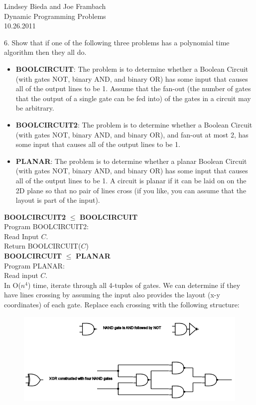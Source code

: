 \documentclass[10pt]{article}
\newcommand{\tab}{\hspace*{2em}}
\begin{document}
	\begin{flushright}
	Lindsey Bieda and Joe Frambach\\
	Dynamic Programming Problems\\
	10.26.2011
	\end{flushright}
	6.  Show that if one of the following three problems has a polynomial time algorithm then they all do.
	\begin{itemize}
		\item \textbf{BOOLCIRCUIT}: The problem is to determine whether a Boolean Circuit (with gates NOT, binary AND, and
					binary OR) has some input that causes all of the output lines to be 1.  Assume that the fan-out
					(the number of gates that the output of a single gate can be fed into) of the gates in a circuit may
					be arbitrary.
		\item \textbf{BOOLCIRCUIT2}: The problem is to determine whether a Boolean Circuit (with gates NOT, binary AND, and
					binary OR), and fan-out at most 2, has some input that causes all of the output lines to be 1.
		\item \textbf{PLANAR}: The problem is to determine whether a planar Boolean Circuit (with gates NOT, binary AND,
					and binary OR) has some input that causes all of the output lines to be 1. A circuit is planar if
					it can be laid on on the 2D plane so that no pair of lines cross (if you like, you can assume that
					the layout is part of the input).
	\end{itemize}
    \textbf{BOOLCIRCUIT2} $\leq$ \textbf{BOOLCIRCUIT}\\
	Program BOOLCIRCUIT2:\\
	\tab Read Input $C$.\\
	\tab Return BOOLCIRCUIT($C$)\\
	\newpage
	\textbf{BOOLCIRCUIT} $\leq$ \textbf{PLANAR}\\
	Program PLANAR:\\
	\tab Read input $C$.\\
	\tab In O($n^4$) time, iterate through all 4-tuples of gates. We can determine if they have lines crossing by
	assuming the input also provides the layout (x-y coordinates) of each gate. Replace each crossing with the
	following structure:\\
\begin{figure}[h]
	\centering
		\includegraphics[width=450px]{red6.png}
\end{figure}
\end{document}
